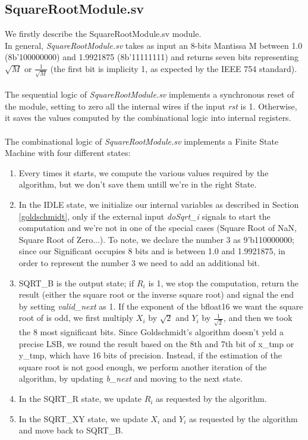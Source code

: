 \subsection{SquareRootModule.sv}
We firstly describe the SquareRootModule.sv module. \\
In general, \emph{SquareRootModule.sv} takes as input an 8-bits Mantissa M between 1.0 (8b'100000000) and 1.9921875 (8b'11111111) and returns seven bits representing $\sqrt{M}$ or $\frac{1}{\sqrt{M}}$ (the first bit is implicity 1, as expected by the IEEE 754 standard).\\\\
The sequential logic of \emph{SquareRootModule.sv} implements a synchronous reset of the module, setting to zero all the internal wires if the input \emph{rst} is 1. Otherwise, it saves the values computed by the combinational logic into internal registers.\\\\
The combinational logic of \emph{SquareRootModule.sv} implements a Finite State Machine with four different states:
\begin{enumerate}
\item Every times it starts, we compute the various values required by the algorithm, but we don't save them untill we're in the right State.
\item In the IDLE state, we initialize our internal variables as described in Section \ref{goldschmidt}, only if the external input \emph{doSqrt\_i} signals to start the computation and we're not in one of the special cases (Square Root of NaN, Square Root of Zero...). To note, we declare the number 3 as 9'b110000000; since our Significant occupies 8 bits and is between 1.0 and 1.9921875, in order to represent the number 3 we need to add an additional bit. 
\item SQRT\_B is the output state; if $R_i$ is 1, we stop the computation, return the result (either the square root or the inverse square root) and signal the end by setting \emph{valid\_next} as 1. If the exponent of the bfloat16 we want the square root of is odd, we first multiply $X_i$ by $\sqrt{2}$ and $Y_i$ by $\frac{1}{\sqrt{2}}$, and then we took the 8 most significant bits. Since Goldschmidt's algorithm doesn't yeld a precise LSB, we round the result based on the 8th and 7th bit of x\_tmp or y\_tmp, which have 16 bits of precision. Instead, if the estimation of the square root is not good enough, we perform another iteration of the algorithm, by updating \emph{b\_next} and moving to the next state.
\item In the SQRT\_R state, we update $R_i$ as requested by the algorithm.
\item In the SQRT\_XY state, we update $X_i$ and $Y_i$ as requested by the algorithm and move back to SQRT\_B.
\end{enumerate}

